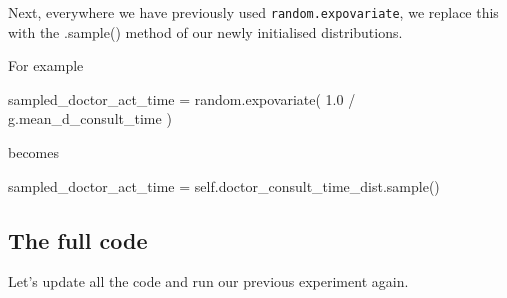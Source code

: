\documentclass[
  letterpaper,
  DIV=11,
  numbers=noendperiod]{scrreprt}
\newenvironment{Shaded}{}{}
\newcommand{\FloatTok}[1]{\textcolor[rgb]{0.00,0.36,0.77}{#1}}
\newcommand{\NormalTok}[1]{\textcolor[rgb]{0.14,0.16,0.18}{#1}}
\newcommand{\OperatorTok}[1]{\textcolor[rgb]{0.14,0.16,0.18}{#1}}
\newcommand{\VariableTok}[1]{\textcolor[rgb]{0.89,0.38,0.04}{#1}}
\begin{document}
Next, everywhere we have previously used \texttt{random.expovariate}, we
replace this with the .sample() method of our newly initialised
distributions.

For example

\begin{Shaded}
\begin{Highlighting}[]
\NormalTok{sampled\_doctor\_act\_time }\OperatorTok{=}\NormalTok{ random.expovariate(}
    \FloatTok{1.0} \OperatorTok{/}\NormalTok{ g.mean\_d\_consult\_time}
\NormalTok{)}
\end{Highlighting}
\end{Shaded}

becomes

\begin{Shaded}
\begin{Highlighting}[]
\NormalTok{sampled\_doctor\_act\_time }\OperatorTok{=} \VariableTok{self}\NormalTok{.doctor\_consult\_time\_dist.sample()}
\end{Highlighting}
\end{Shaded}

\subsection{The full code}\label{the-full-code-2}

Let's update all the code and run our previous experiment again.
\end{document}
